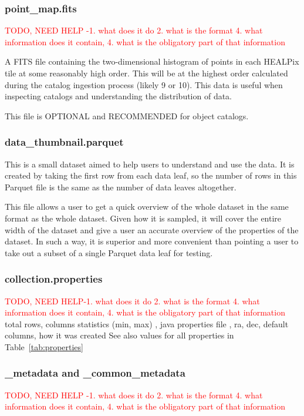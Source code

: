 \documentclass[11pt,a4paper]{ivoa}
\begin{document}
\subsubsection{point\_map.fits} 
   \textcolor{red}{TODO, NEED HELP -1. what does it do 2. what is the format 4. what information does it contain, 4. what is the obligatory part of that information}
   
A FITS file containing the two-dimensional histogram of points in each HEALPix tile at some reasonably high order.
This will be at the highest order calculated during the catalog ingestion process (likely 9 or 10). 
This data is useful when inspecting catalogs and understanding the distribution of data. 

This file is OPTIONAL and RECOMMENDED for object catalogs.
           \subsubsection{data\_thumbnail.parquet} 
  This is a small dataset aimed to help users to understand and use the data. It is created by taking the first row from each data leaf, so the number of rows in this Parquet file is the same as the number of data leaves altogether. \par
  This file allows a user to get a quick overview of the whole dataset in the same format as the whole dataset. Given how it is sampled, it will cover the entire width of the dataset and give a user an accurate overview of the properties of the dataset. In such a way, it is superior and more convenient than pointing a user to take out a subset of a single Parquet data leaf for testing. 
    
        \subsubsection{collection.properties} 
   \textcolor{red}{TODO, NEED HELP-1. what does it do 2. what is the format 4. what information does it contain, 4. what is the obligatory part of that information}
     total rows, columns statistics (min, max) , java properties file , ra, dec, default columns, how it was created 
    See also values for all properties in Table~\ref{tab:properties}

    
        \subsubsection{\_metadata and \_common\_metadata} 
   \textcolor{red}{TODO, NEED HELP -1. what does it do 2. what is the format 4. what information does it contain, 4. what is the obligatory part of that information}
\end{document}
